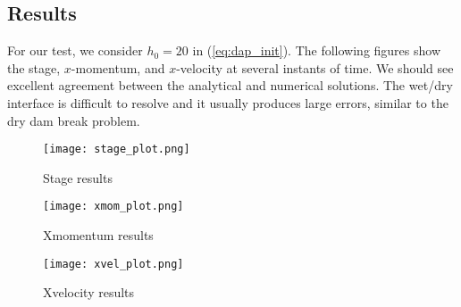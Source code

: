 \subsection{Results}

For our test, we consider $h_0=20$ in (\ref{eq:dap_init}).
The following figures show the stage, $x$-momentum, and $x$-velocity at several instants of time. We should see excellent agreement between the analytical and numerical solutions. The wet/dry interface is difficult to resolve and it usually produces large errors, similar to the dry dam break problem.
\begin{figure}[h]
\begin{center}
\texttt{[image: stage\_plot.png]}
\end{center}
\caption{Stage results}
\end{figure}


\begin{figure}[h]
\begin{center}
\texttt{[image: xmom\_plot.png]}
\end{center}
\caption{Xmomentum results}
\end{figure}


\begin{figure}[h]
\begin{center}
\texttt{[image: xvel\_plot.png]}
\end{center}
\caption{Xvelocity results}
\end{figure}


\endinput
